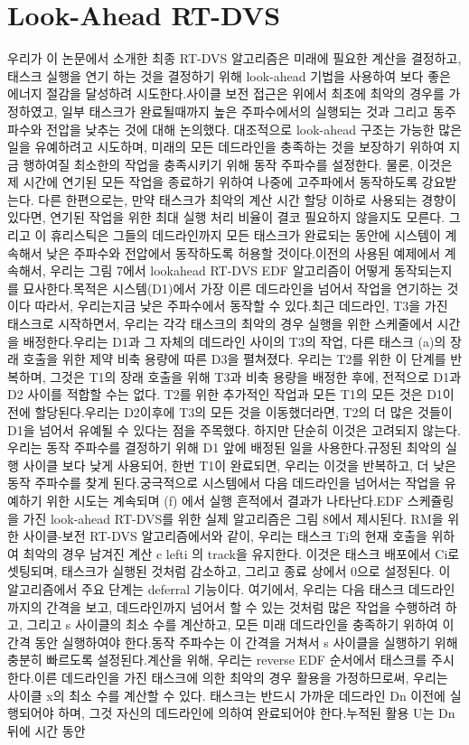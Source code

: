 \documentclass[11pt
  , a4paper
  , article
  , oneside
]{memoir}
\begin{document}
\section{Look-Ahead RT-DVS}
우리가 이 논문에서 소개한 최종 RT-DVS 알고리즘은 미래에 필요한 계산을 결정하고, 태스크 실행을 연기 하는 것을 결정하기 위해 look-ahead 기법을 사용하여 보다 좋은 에너지 절감을 달성하려 시도한다.사이클 보전 접근은 위에서 최초에 최악의 경우를 가정하였고, 일부 태스크가 완료될때까지 높은 주파수에서의 실행되는 것과 그리고 동주파수와 전압을 낮추는 것에 대해 논의했다. 대조적으로 look-ahead 구조는 가능한 많은 일을 유예하려고 시도하며, 미래의 모든 데드라인을 충족하는 것을 보장하기 위하여 지금 행하여질 최소한의 작업을 충족시키기 위해 동작 주파수를 설정한다. 물론, 이것은 제 시간에 연기된 모든 작업을 종료하기 위하여 나중에 고주파에서 동작하도록 강요받는다. 다른 한편으로는, 만약 태스크가 최악의 계산 시간 할당 이하로 사용되는 경향이 있다면, 연기된 작업을 위한 최대 실행 처리 비율이 결코 필요하지 않을지도 모른다. 그리고 이 휴리스틱은 그들의 데드라인까지 모든 태스크가 완료되는 동안에 시스템이 계속해서 낮은 주파수와 전압에서 동작하도록 허용할 것이다.이전의 사용된 예제에서 계속해서, 우리는 그림 7에서 lookahead RT-DVS EDF 알고리즘이 어떻게 동작되는지를 묘사한다.목적은 시스템(D1)에서 가장 이른 데드라인을 넘어서 작업을 연기하는 것이다 따라서, 우리는지금 낮은 주파수에서 동작할 수 있다.최근 데드라인, T3을 가진 태스크로 시작하면서, 우리는 각각 태스크의 최악의 경우 실행을 위한 스케줄에서 시간을 배정한다.우리는 D1과 그 자체의 데드라인 사이의 T3의 작업, 다른 태스크 (a)의 장래 호출을 위한 제약 비축 용량에 따른 D3을 펼쳐졌다. 우리는 T2를 위한 이 단계를 반복하며, 그것은 T1의 장래 호출을 위해 T3과 비축 용량을 배정한 후에, 전적으로 D1과 D2 사이를 적합할 수는 없다. T2를 위한 추가적인 작업과 모든 T1의 모든 것은 D1이전에 할당된다.우리는 D2이후에 T3의 모든 것을 이동했더라면, T2의 더 많은 것들이 D1을 넘어서 유예될 수 있다는 점을 주목했다. 하지만 단순히 이것은 고려되지 않는다.우리는 동작 주파수를 결정하기 위해 D1 앞에 배정된 일을 사용한다.규정된 최악의 실행 사이클 보다 낮게 사용되어, 한번 T1이 완료되면, 우리는 이것을 반복하고, 더 낮은 동작 주파수를 찾게 된다.궁극적으로 시스템에서 다음 데드라인을 넘어서는 작업을 유예하기 위한 시도는 계속되며 (f) 에서 실행 흔적에서 결과가 나타난다.EDF 스케쥴링을 가진 look-ahead RT-DVS를 위한 실제 알고리즘은 그림 8에서 제시된다. RM을 위한 사이클-보전 RT-DVS 알고리즘에서와 같이, 우리는 태스크 Ti의 현재 호출을 위하여 최악의 경우 남겨진 계산 c lefti 의 track을 유지한다. 이것은 태스크 배포에서 Ci로 셋팅되며, 태스크가 실행된 것처럼 감소하고, 그리고 종료 상에서 0으로 설정된다. 이 알고리즘에서 주요 단계는 deferral 기능이다. 여기에서, 우리는 다음 태스크 데드라인까지의 간격을 보고, 데드라인까지 넘어서 할 수 있는 것처럼 많은 작업을 수행하려 하고, 그리고 s 사이클의 최소 수를 계산하고, 모든 미래 데드라인을 충족하기 위하여 이 간격 동안 실행하여야 한다.동작 주파수는 이 간격을 거쳐서 s 사이클을 실행하기 위해 충분히 빠르도록 설정된다.계산을 위해, 우리는 reverse EDF 순서에서 태스크를 주시한다.이른 데드라인을 가진 태스크에 의한 최악의 경우 활용을 가정하므로써, 우리는 사이클 x의 최소 수를 계산할 수 있다. 태스크는 반드시 가까운 데드라인 Dn  이전에 실행되어야 하며, 그것 자신의 데드라인에 의하여 완료되어야 한다.누적된 활용 U는 Dn 뒤에 시간 동안 
\end{document}
